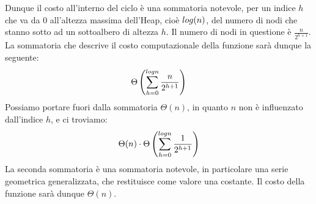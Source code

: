 \documentclass[12pt]{report}
\begin{document}
\begin{description}
    	Dunque il costo all'interno del ciclo è una sommatoria notevole, per un indice $h$ che va da $0$ all'altezza massima dell'Heap, cioè $\\log(n)$, del numero di nodi che stanno sotto ad un sottoalbero di altezza $h$. Il numero di nodi in questione è $\frac{n}{2^{h+1}}$. La sommatoria che descrive il costo computazionale della funzione sarà dunque la seguente:
    	\[
    	\Theta\left( \sum_{h=0}^{\\log n} \frac{n}{2^{h+1}} \right)
    	\]
    	Possiamo portare fuori dalla sommatoria $\Theta(n)$, in quanto $n$ non è influenzato dall'indice $h$, e ci troviamo:
    	\[
    	\Theta(n) \cdot \Theta\left( \sum_{h=0}^{\\log n} \frac{1}{2^{h+1}} \right)
    	\]
    	La seconda sommatoria è una sommatoria notevole, in particolare una serie geometrica generalizzata, che restituisce come valore una costante. Il costo della funzione sarà dunque $\Theta(n)$.
    	
    \end{description}
    
\end{document}
